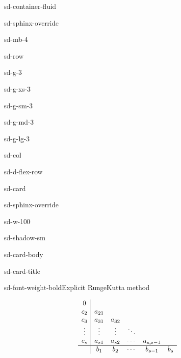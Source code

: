 \documentclass[letterpaper,10pt,english]{jupyterBook}
\begin{document}
\begin{sphinxuseclass}{sd-container-fluid}
\begin{sphinxuseclass}{sd-sphinx-override}
\begin{sphinxuseclass}{sd-mb-4}
\begin{sphinxuseclass}{sd-row}
\begin{sphinxuseclass}{sd-g-3}
\begin{sphinxuseclass}{sd-g-xs-3}
\begin{sphinxuseclass}{sd-g-sm-3}
\begin{sphinxuseclass}{sd-g-md-3}
\begin{sphinxuseclass}{sd-g-lg-3}
\begin{sphinxuseclass}{sd-col}
\begin{sphinxuseclass}{sd-d-flex-row}
\begin{sphinxuseclass}{sd-card}
\begin{sphinxuseclass}{sd-sphinx-override}
\begin{sphinxuseclass}{sd-w-100}
\begin{sphinxuseclass}{sd-shadow-sm}
\begin{sphinxuseclass}{sd-card-body}
\begin{sphinxuseclass}{sd-card-title}
\begin{sphinxuseclass}{sd-font-weight-bold}Explicit Runge\sphinxhyphen{}Kutta method
\end{sphinxuseclass}
\end{sphinxuseclass}\begin{align*}
    \begin{array}{c|ccccc}
        0 &  &  &  &  & \\
        c_2  & a_{21}  &  &  &  & \\
        c_3  & a_{31}  & a_{32}  &  &  & \\
        \vdots  & \vdots  & \vdots  & \ddots  &  & \\
        c_s  & a_{s1}  & a_{s2}  & \cdots  & a_{s,s-1}  & \\ \hline
        & b_1  & b_2  & \cdots  & b_{s-1}  & b_s 
    \end{array}
\end{align*}
\end{sphinxuseclass}
\end{sphinxuseclass}
\end{sphinxuseclass}
\end{sphinxuseclass}
\end{sphinxuseclass}
\end{sphinxuseclass}

\end{sphinxuseclass}
\end{sphinxuseclass}
\end{sphinxuseclass}
\end{sphinxuseclass}
\end{sphinxuseclass}
\end{sphinxuseclass}
\end{sphinxuseclass}
\end{sphinxuseclass}
\end{sphinxuseclass}
\end{sphinxuseclass}
\end{document}
